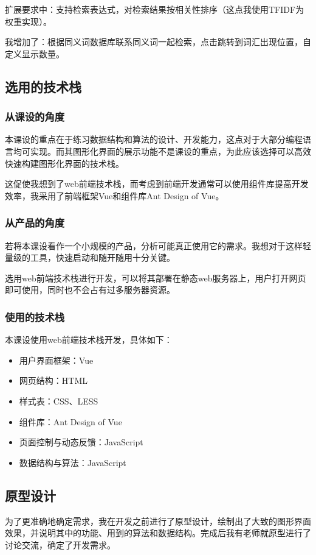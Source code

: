 \documentclass[scheme = chinese]{ctexart}
\begin{document}
扩展要求中：支持检索表达式，对检索结果按相关性排序（这点我使用TFIDF为权重实现）。

我增加了：根据同义词数据库联系同义词一起检索，点击跳转到词汇出现位置，自定义显示数量。

\subsection{选用的技术栈}
\subsubsection{从课设的角度} 本课设的重点在于练习数据结构和算法的设计、开发能力，这点对于大部分编程语言均可实现。而其图形化界面的展示功能不是课设的重点，为此应该选择可以高效快速构建图形化界面的技术栈。

这促使我想到了web前端技术栈，而考虑到前端开发通常可以使用组件库提高开发效率，我采用了前端框架Vue和组件库Ant Design of Vue。

\subsubsection{从产品的角度}
若将本课设看作一个小规模的产品，分析可能真正使用它的需求。我想对于这样轻量级的工具，快速启动和随开随用十分关键。

选用web前端技术栈进行开发，可以将其部署在静态web服务器上，用户打开网页即可使用，同时也不会占有过多服务器资源。

\subsubsection{使用的技术栈}
本课设使用web前端技术栈开发，具体如下：
\begin{itemize}
    \item 用户界面框架：Vue
    \item 网页结构：HTML
    \item 样式表：CSS、LESS
    \item 组件库：Ant Design of Vue
    \item 页面控制与动态反馈：JavaScript
    \item 数据结构与算法：JavaScript
\end{itemize}

\subsection{原型设计}
为了更准确地确定需求，我在开发之前进行了原型设计，绘制出了大致的图形界面效果，并说明其中的功能、用到的算法和数据结构。完成后我有老师就原型进行了讨论交流，确定了开发需求。
\end{document}
